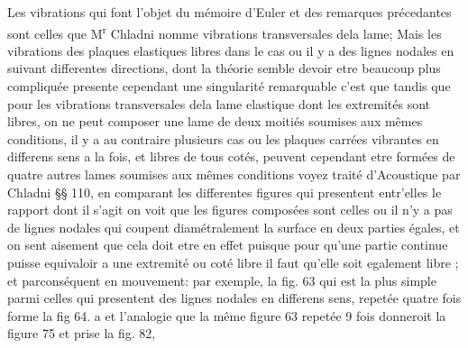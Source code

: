 \documentclass[11pt,a4paper]{article}
\begin{document}
Les vibrations qui font l'objet du mémoire d'Euler et
des  remarques précedantes sont celles que M\textsuperscript{r} Chladni
nomme vibrations transversales dela lame; Mais les vibrations des
plaques elastiques  libres dans le cas ou il y a des lignes
nodales en  suivant differentes directions, dont la théorie
semble devoir etre beaucoup plus compliquée presente cependant
une singularité remarquable c'est que tandis que pour les
vibrations transversales dela lame elastique dont les extremités
sont libres, on ne peut composer une lame de deux moitiés
soumises aux mêmes conditions, il y a au contraire plusieurs
cas ou les  plaques carrées vibrantes en differens sens a la
fois, et libres de tous cotés, peuvent cependant etre formées
de quatre autres lames soumises aux mêmes conditions voyez
traité d'Acoustique par Chladni §§ 110, en comparant les
differentes figures qui presentent entr'elles le rapport dont
il s'agit on voit que les figures composées sont celles
ou il n'y a pas de lignes nodales qui coupent  diamétralement la surface
en deux parties égales, et on sent aisement que cela doit
etre en effet puisque pour qu'une partie continue puisse
equivaloir a une extremité ou coté libre il faut qu'elle
soit egalement libre ; et parconséquent
en mouvement: par exemple, la fig. 63 qui est la plus simple
parmi celles qui presentent des lignes nodales en differens sens,
repetée quatre fois forme la fig 64. a et l'analogie 
  que la même figure 63 repetée 9 fois donneroit
la figure 75 et  prise   la fig. 82,  
\end{document}
